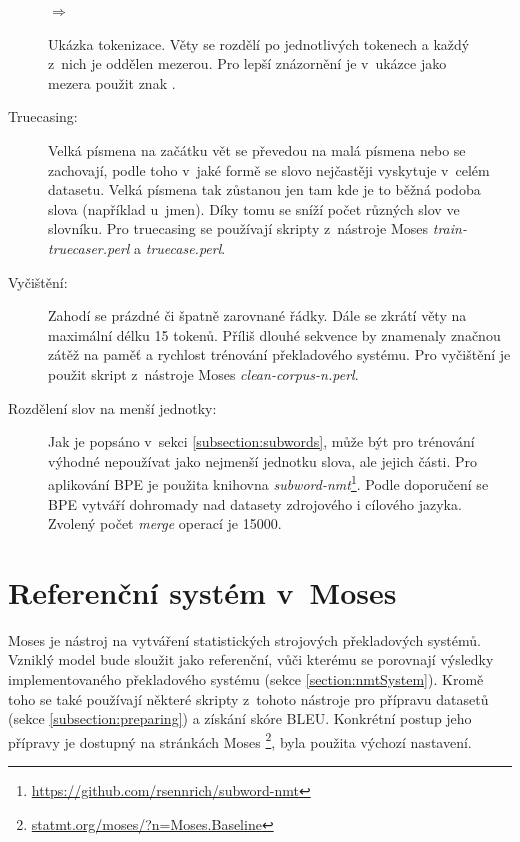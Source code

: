 \begin{figure}[H]
    \begin{center}
     \setlength{\fboxsep}{8pt}
        $\Longrightarrow$
        \setlength{\fboxsep}{8pt}
    \end{center}
	\caption{Ukázka tokenizace. Věty se rozdělí po jednotlivých tokenech a každý z~nich je oddělen mezerou. Pro lepší znázornění je v~ukázce jako mezera použit znak \uv{\textvisiblespace}.}
	\label{img:tokenization}
\end{figure}


\begin{description}
  \item[Truecasing:] Velká písmena na začátku vět se převedou na malá písmena nebo se zachovají, podle toho v~jaké formě se slovo nejčastěji vyskytuje v~celém datasetu. Velká písmena tak zůstanou jen tam kde je to běžná podoba slova (například u~jmen). Díky tomu se sníží počet různých slov ve slovníku. Pro truecasing se používají skripty z~nástroje Moses \emph{train-truecaser.perl} a \emph{truecase.perl}.
\end{description}

\begin{description}
  \item[Vyčištění:] Zahodí se prázdné či špatně zarovnané řádky. Dále se zkrátí věty na maximální délku 15 tokenů. Příliš dlouhé sekvence by znamenaly značnou zátěž na paměť a rychlost trénování překladového systému. Pro vyčištění je použit skript z~nástroje Moses \emph{clean-corpus-n.perl}.
\end{description}

\begin{description}
  \item[Rozdělení slov na menší jednotky:]\label{description:bpeApplication} Jak je popsáno v~sekci \ref{subsection:subwords}, může být pro trénování výhodné nepoužívat jako nejmenší jednotku slova, ale jejich části. Pro aplikování BPE je použita knihovna \emph{subword-nmt}\footnote{\url{https://github.com/rsennrich/subword-nmt}}. Podle doporučení se BPE vytváří dohromady nad datasety zdrojového i cílového jazyka. Zvolený počet \emph{merge} operací je 15000.
\end{description}


\section{Referenční systém v~Moses}\label{section:referent}
Moses \cite{moses} je nástroj na vytváření statistických strojových překladových systémů. Vzniklý model bude sloužit jako referenční, vůči kterému se porovnají výsledky implementovaného překladového systému (sekce \ref{section:nmtSystem}). Kromě toho se také používají některé skripty z~tohoto nástroje pro přípravu datasetů (sekce \ref{subsection:preparing}) a získání skóre BLEU. Konkrétní postup jeho přípravy je dostupný na stránkách Moses \footnote{\url{statmt.org/moses/?n=Moses.Baseline}}, byla použita výchozí nastavení.


